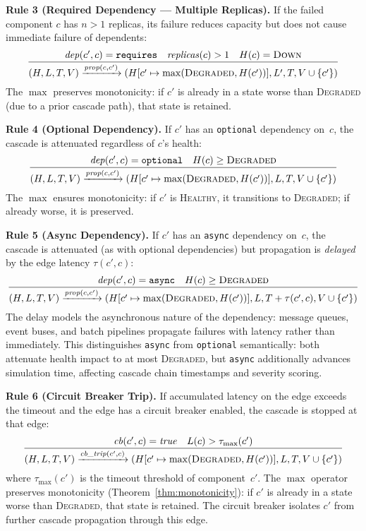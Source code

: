 \documentclass[10pt,twocolumn]{article}
\begin{document}
\medskip\noindent
\textbf{Rule 3 (Required Dependency --- Multiple Replicas).}
If the failed component $c$ has $n > 1$ replicas, its failure reduces
capacity but does not cause immediate failure of dependents:
\begin{equation}
  \frac{\mathit{dep}(c', c) = \texttt{requires} \quad
        \mathit{replicas}(c) > 1 \quad
        H(c) = \textsc{Down}}
  {(H, L, T, V) \xrightarrow{\textit{prop}(c, c')}
   (H[c' \mapsto \max(\textsc{Degraded}, H(c'))], L', T, V \cup \{c'\})}
\end{equation}
The $\max$ preserves monotonicity: if $c'$ is already in a state
worse than \textsc{Degraded} (due to a prior cascade path), that
state is retained.

\medskip\noindent
\textbf{Rule 4 (Optional Dependency).}
If $c'$ has an \texttt{optional} dependency on~$c$, the cascade is
attenuated regardless of $c$'s health:
\begin{equation}
  \frac{\mathit{dep}(c', c) = \texttt{optional} \quad
        H(c) \ge \textsc{Degraded}}
  {(H, L, T, V) \xrightarrow{\textit{prop}(c, c')}
   (H[c' \mapsto \max(\textsc{Degraded}, H(c'))], L, T, V \cup \{c'\})}
\end{equation}
The $\max$ ensures monotonicity: if $c'$ is \textsc{Healthy}, it
transitions to \textsc{Degraded}; if already worse, it is preserved.

\medskip\noindent
\textbf{Rule 5 (Async Dependency).}
If $c'$ has an \texttt{async} dependency on~$c$, the cascade is
attenuated (as with optional dependencies) but propagation is
\emph{delayed} by the edge latency $\tau(c', c)$:
\begin{equation}
  \frac{\mathit{dep}(c', c) = \texttt{async} \quad
        H(c) \ge \textsc{Degraded}}
  {(H, L, T, V) \xrightarrow{\textit{prop}(c, c')}
   (H[c' \mapsto \max(\textsc{Degraded}, H(c'))], L,
    T + \tau(c', c), V \cup \{c'\})}
\end{equation}
The delay models the asynchronous nature of the dependency:
message queues, event buses, and batch pipelines propagate
failures with latency rather than immediately. This distinguishes
\texttt{async} from \texttt{optional} semantically: both attenuate
health impact to at most \textsc{Degraded}, but \texttt{async}
additionally advances simulation time, affecting cascade chain
timestamps and severity scoring.

\medskip\noindent
\textbf{Rule 6 (Circuit Breaker Trip).}
If accumulated latency on the edge exceeds the timeout and the edge has
a circuit breaker enabled, the cascade is stopped at that edge:
\begin{equation}
  \frac{\mathit{cb}(c', c) = \mathit{true} \quad
        L(c) > \tau_{\max}(c')}
  {(H, L, T, V) \xrightarrow{\textit{cb\_trip}(c', c)}
   (H[c' \mapsto \max(\textsc{Degraded}, H(c'))], L, T, V \cup \{c'\})}
\end{equation}
where $\tau_{\max}(c')$ is the timeout threshold of component~$c'$.
The $\max$ operator preserves monotonicity
(Theorem~\ref{thm:monotonicity}): if $c'$ is already in a state
worse than \textsc{Degraded}, that state is retained.
The circuit breaker isolates $c'$ from further cascade propagation
through this edge.
\end{document}
